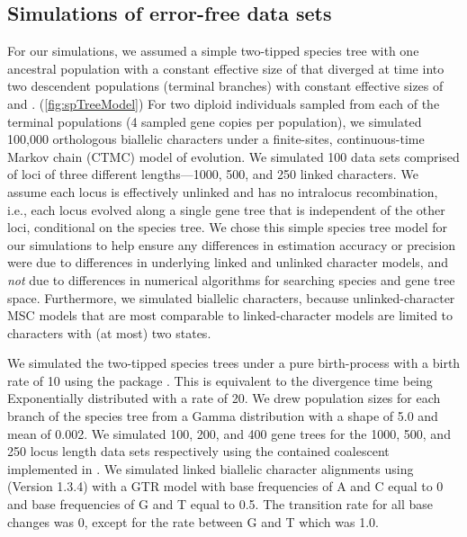 \subsection{Simulations of error-free data sets}
For our simulations, we assumed a simple two-tipped species tree
with one ancestral population with a constant effective size
of
\rootpopsize
that diverged at time \divtime into
two descendent populations (terminal branches) with constant
effective sizes of
\tippopsize[1]
and
\tippopsize[2]
.
(\cref{fig:spTreeModel})
For two diploid individuals sampled from each of the terminal
populations (4 sampled gene copies per population),
we simulated 100,000 orthologous biallelic characters under a finite-sites,
continuous-time Markov chain (CTMC) model of evolution.
We simulated 100 data sets comprised of loci of three different lengths---1000,
500, and 250 linked characters.
We assume each locus is effectively unlinked and has no intralocus
recombination, i.e., each locus evolved along a single gene tree that is
independent of the other loci, conditional on the species tree.
We chose this simple species tree model for our simulations to help ensure any
differences in estimation accuracy or precision were due to differences in
underlying linked and unlinked character models,
and \emph{not} due to differences in numerical algorithms for searching species
and gene tree space.
Furthermore, we simulated biallelic characters, because unlinked-character MSC
models
\citep{bryantInferringSpeciesTrees2012,Oaks2018ecoevolity}
that are most comparable to linked-character models
\citep{Heled2010,ogilvieStarBEAST2BringsFaster2017}
are limited to characters with (at most) two states.

We simulated the two-tipped species trees under a pure birth-process with a
birth rate of 10 using the \python package
\dendropy
\citep[Version 4.40;  branch commit eb69003;][]{Dendropy}.  
This is equivalent to the divergence time being Exponentially distributed with
a rate of 20.
We drew population sizes for each branch of the species tree from a Gamma 
distribution with a shape of 5.0 and mean of 0.002. We simulated 100, 200, and 
400 gene trees for the 1000, 500, and 250 locus length data sets respectively 
using the contained coalescent implemented in \dendropy.
We simulated linked biallelic character alignments using
\seqgen (Version 1.3.4)
\citep{rambautSeqGenApplicationMonte1997}
with a GTR model with base frequencies of A and C equal to 0 and base 
frequencies of G and T equal to 0.5. The transition rate for all base changes was 
0, except for the rate between G and T which was 1.0. 

